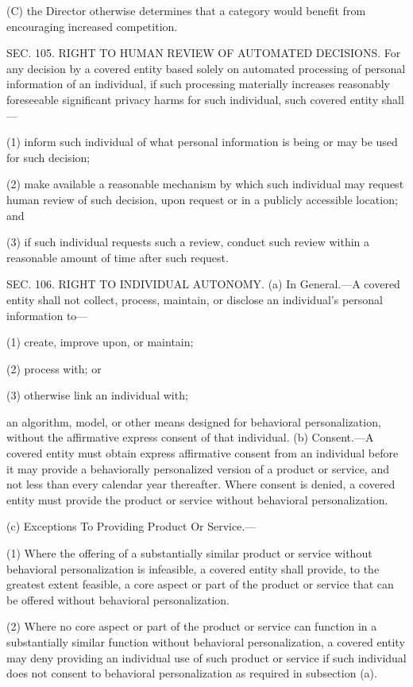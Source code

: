 (C) the Director otherwise determines that a category would benefit from encouraging increased competition.


SEC. 105. RIGHT TO HUMAN REVIEW OF AUTOMATED DECISIONS.
For any decision by a covered entity based solely on automated processing of personal information of an individual, if such processing materially increases reasonably foreseeable significant privacy harms for such individual, such covered entity shall—

(1) inform such individual of what personal information is being or may be used for such decision;

(2) make available a reasonable mechanism by which such individual may request human review of such decision, upon request or in a publicly accessible location; and

(3) if such individual requests such a review, conduct such review within a reasonable amount of time after such request.


SEC. 106. RIGHT TO INDIVIDUAL AUTONOMY.
(a) In General.—A covered entity shall not collect, process, maintain, or disclose an individual’s personal information to—

(1) create, improve upon, or maintain;

(2) process with; or

(3) otherwise link an individual with;

an algorithm, model, or other means designed for behavioral personalization, without the affirmative express consent of that individual.
(b) Consent.—A covered entity must obtain express affirmative consent from an individual before it may provide a behaviorally personalized version of a product or service, and not less than every calendar year thereafter. Where consent is denied, a covered entity must provide the product or service without behavioral personalization.

(c) Exceptions To Providing Product Or Service.—

(1) Where the offering of a substantially similar product or service without behavioral personalization is infeasible, a covered entity shall provide, to the greatest extent feasible, a core aspect or part of the product or service that can be offered without behavioral personalization.

(2) Where no core aspect or part of the product or service can function in a substantially similar function without behavioral personalization, a covered entity may deny providing an individual use of such product or service if such individual does not consent to behavioral personalization as required in subsection (a).

